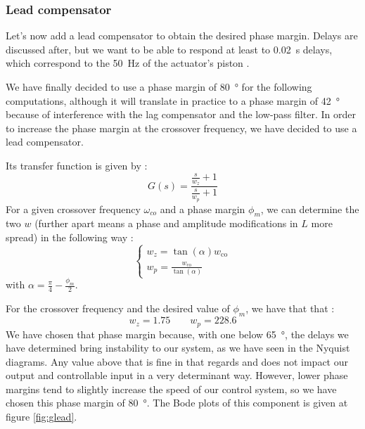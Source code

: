 \subsubsection{Lead compensator}
Let's now add a lead compensator to obtain the desired phase margin. Delays are discussed after, but we want to be able to respond at least to \SI{0.02}{\second} delays, which correspond to the \SI{50}{\hertz} of the actuator's piston \cite{Hassan_2016}.\par
We have finally decided to use a phase margin of \SI{80}{\degree} for the following computations, although it will translate in practice to a phase margin of \SI{42}{\degree} because of interference with the lag compensator and the low-pass filter. In order to increase the phase margin at the crossover frequency, we have decided to use a lead compensator.\par
Its transfer function is given by : 
$$
G(s) = \dfrac{\frac{s}{w_z} + 1}{\frac{s}{w_p} +1}
$$
For a given crossover frequency $\omega_{co}$ and a phase margin $\phi_m$, we can determine the two $w$ (further apart means a phase and amplitude modifications in $L$ more spread) in the following way : 
$$
\left\{\begin{array}{l}
    {w_{z}=\tan (\alpha) w_{\mathrm{co}}} \\
    {w_{p}=\frac{w_{\mathrm{co}}}{\tan (\alpha)}}
\end{array}\right.
$$
with $\alpha = \frac{\pi}{4} - \frac{\phi_m}{2}$.\par
For the crossover frequency and the desired value of $\phi_m$, we have that that : 
$$
w_z = \num{1.75} \qquad w_p = \num{228.6}
$$
We have chosen that phase margin because, with one below \SI{65}{\degree}, the delays we have determined bring instability to our system, as we have seen in the Nyquist diagrams. Any value above that is fine in that regards and does not impact our output and controllable input in a very determinant way. However, lower phase margins tend to slightly increase the speed of our control system, so we have chosen this phase margin of \og{}\SI{80}{\degree}\fg{}. The Bode plots of this component is given at figure  \ref{fig:glead}.
